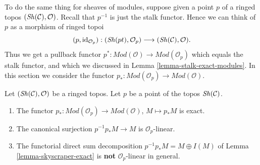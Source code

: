 \noindent
To do the same thing for sheaves of modules, suppose given a point
$p$ of a ringed topos $(\mathop{\mathit{Sh}}\nolimits(\mathcal{C}), \mathcal{O})$.
Recall that $p^{-1}$ is just the stalk functor.
Hence we can think of $p$ as a morphism of ringed topoi
$$
(p, \text{id}_{\mathcal{O}_p}) :
(\mathop{\mathit{Sh}}\nolimits(pt), \mathcal{O}_p)
\longrightarrow
(\mathop{\mathit{Sh}}\nolimits(\mathcal{C}), \mathcal{O}).
$$
Thus we get a pullback functor
$p^* : \textit{Mod}(\mathcal{O}) \to \textit{Mod}(\mathcal{O}_p)$
which equals the stalk functor, and which we discussed in
Lemma \ref{lemma-stalk-exact-modules}.
In this section we consider the functor
$p_* : \textit{Mod}(\mathcal{O}_p) \to \textit{Mod}(\mathcal{O})$.

\begin{lemma}
\label{lemma-skyscraper-modules-exact}
Let $(\mathop{\mathit{Sh}}\nolimits(\mathcal{C}), \mathcal{O})$ be a ringed topos.
Let $p$ be a point of the topos $\mathop{\mathit{Sh}}\nolimits(\mathcal{C})$.
\begin{enumerate}
\item The functor
$p_* : \textit{Mod}(\mathcal{O}_p) \to \textit{Mod}(\mathcal{O})$,
$M \mapsto p_*M$ is exact.
\item The canonical surjection $p^{-1}p_*M \to M$ is $\mathcal{O}_p$-linear.
\item The functorial direct sum decomposition
$p^{-1}p_*M = M \oplus I(M)$ of Lemma \ref{lemma-skyscraper-exact}
is {\bf not} $\mathcal{O}_p$-linear in general.
\end{enumerate}
\end{lemma}

